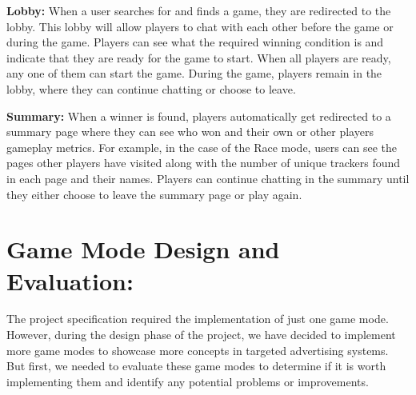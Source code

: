 \documentclass{l4proj}
\begin{document}
\textbf{Lobby:} When a user searches for and finds a game, they are redirected to the lobby. This lobby will allow players to chat with each other before the game or during the game. Players can see what the required winning condition is and indicate that they are ready for the game to start. When all players are ready, any one of them can start the game. During the game, players remain in the lobby, where they can continue chatting or choose to leave.

\textbf{Summary:} When a winner is found, players automatically get redirected to a summary page where they can see who won and their own or other players gameplay metrics. For example, in the case of the Race mode, users can see the pages other players have visited along with the number of unique trackers found in each page and their names. Players can continue chatting in the summary until they either choose to leave the summary page or play again. 

\section{Game Mode Design and Evaluation:}
The project specification required the implementation of just one game mode. However, during the design phase of the project, we have decided to implement more game modes to showcase more concepts in targeted advertising systems. But first, we needed to evaluate these game modes to determine if it is worth implementing them and identify any potential problems or improvements.
\end{document}
